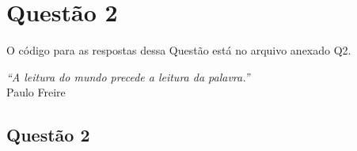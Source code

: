 \documentclass[a4paper,12pt]{article}
\begin{document}
\vspace{1cm}

\section{ Questão 2}

O código para as respostas dessa Questão está no arquivo anexado Q2.
\vspace{1cm}

\begin{flushright}
\textit{“A leitura do mundo precede a leitura da palavra.”}\\
Paulo Freire
\end{flushright}

\newpage
\subsection{Questão 2}

\end{document}
